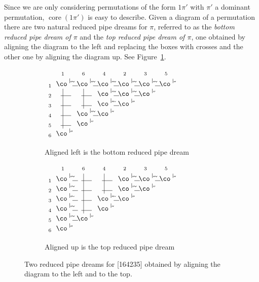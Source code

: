 \documentclass[ALCO,ThmDefs]{cedram}
\numberwithin{equation}{section}
\DeclareMathOperator{\core}{core}
\newcommand*\petit[1]{{\scriptstyle #1}}
\newcommand*\jr{\smash{\raise2pt\hbox{\co \rlap{\rlap{\char'005} \char'007}}\raise6pt\hbox{\rlap{\vrule height6.5pt}}\raise2pt\hbox{\rlap{\hskip4pt \vrule height0.4pt depth0pt width7.7pt}}}}
\newcommand*\je{\smash{\raise2pt\hbox{\co \rlap{\rlap{\char'005}\phantom{\char'007}}}\raise6pt\hbox{\rlap{\vrule height6pt}}}}
\newcommand*\+{\smash{\lower2pt\hbox{\rlap{\vrule height14pt}}\raise2pt\hbox{\rlap{\hskip-3pt \vrule height.4pt depth0pt width14.7pt}}}}
\newcommand*\perm[2]{\hbox{\rlap{$\petit {#1}_{\scriptscriptstyle #2}$}}\phantom{\petit 1}}
\begin{document}
Since we are only considering permutations of the form $1\pi'$ with $\pi'$ a dominant permutation, $\core(1\pi')$ is easy to describe. Given a diagram of a permutation there are two natural reduced pipe dreams for $\pi$, referred to as the \emph{bottom reduced pipe dream of $\pi$} and the \emph{top reduced pipe dream of $\pi$}, one obtained by aligning the diagram to the left and replacing the boxes with crosses and the other one by aligning the diagram up. See Figure~\ref{fig:topbottomrpd}.

\begin{figure}[h]
\begingroup
\arraycolsep=5pt
\centering
\begin{subfigure}[b]{0.35\textwidth}
\centering $
\begin{array}{ccccccc}
&\perm1{}&\perm6{}&\perm4{}&\perm2{}&\perm3{}&\perm5{}\\[0.5em]
\petit1\!\!& \jr & \jr & \jr & \jr & \jr & \je \\[0.2em]
\petit2\!\!& \+ & \+ & \jr & \jr & \je &\\[0.2em]
\petit3\!\!& \+ & \+ & \jr & \je &\\[0.2em]
\petit4\!\!& \+ & \jr & \je &\\[0.2em]
\petit5\!\!& \+ & \je & &\\[0.2em]
\petit6\!\!& \je & & &\\
\end{array}
$
\caption{Aligned left is the bottom reduced pipe dream}
\end{subfigure}
\qquad\quad
\begin{subfigure}[b]{0.4\textwidth}
\centering $
\begin{array}{ccccccc}
&\perm1{}&\perm6{}&\perm4{}&\perm2{}&\perm3{}&\perm5{}\\[0.5em]
\petit1\!\!& \jr & \+ & \+ & \jr & \jr & \je \\[0.2em]
\petit2\!\!& \jr & \+ & \+ & \jr & \je &\\[0.2em]
\petit3\!\!& \jr & \+ & \jr & \je &\\[0.2em]
\petit4\!\!& \jr & \+ & \je &\\[0.2em]
\petit5\!\!& \jr & \je & &\\[0.2em]
\petit6\!\!& \je & & &\\
\end{array}
$
\caption{Aligned up is the top reduced pipe dream}
\end{subfigure}
\endgroup
\caption{Two reduced pipe dreams for [164235] obtained by aligning the diagram to the left and to the top.} \label{fig:topbottomrpd}
\end{figure}
\end{document}
